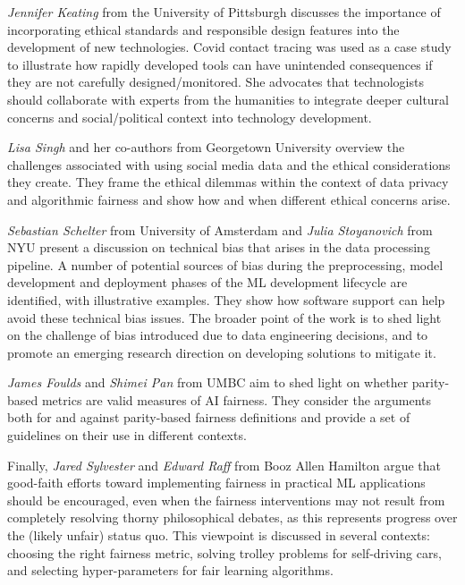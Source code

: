 \documentclass[11pt]{article}
\begin{document}
\textit{Jennifer Keating} from the University of Pittsburgh %
discusses    
the importance of incorporating ethical standards and responsible design features into the development of new technologies. Covid contact tracing was used as a case study to illustrate how rapidly developed tools can have unintended consequences if they are not carefully designed/monitored. She advocates that technologists should collaborate with experts from the humanities to integrate deeper cultural concerns and social/political context into technology development. %

\textit{Lisa Singh} and her co-authors from Georgetown University overview the challenges associated with using social media data and the ethical considerations they create.  They frame the ethical dilemmas within the context of data privacy and algorithmic fairness and show how and when different ethical concerns arise.  

\textit{Sebastian Schelter} from University of Amsterdam and \textit{Julia Stoyanovich}  from NYU present a discussion on technical bias that arises in the data processing pipeline.  A number of potential sources of bias during the preprocessing, model development and deployment phases of the ML development lifecycle are identified, with illustrative examples.  They  show how software support can help avoid these technical bias issues.  The broader point of the work is to shed light on the challenge of bias introduced due to data engineering decisions, and to promote an emerging research direction on developing solutions to mitigate it.

\textit{James Foulds} and \textit{Shimei Pan} from UMBC  aim to shed light on whether parity-based metrics are valid measures of AI fairness. They consider the arguments both for and against parity-based fairness definitions and provide a set of guidelines on their use in different contexts. 

Finally, \textit{Jared Sylvester} and \textit{Edward Raff} from Booz Allen Hamilton argue that good-faith efforts toward implementing fairness in practical ML applications should be encouraged, even when the fairness interventions may not result from completely resolving thorny philosophical debates, as this represents progress over the (likely unfair) status quo.  This viewpoint is discussed in several contexts: choosing the right fairness metric, solving trolley problems for self-driving cars, and selecting hyper-parameters for fair learning algorithms.

\end{document}
